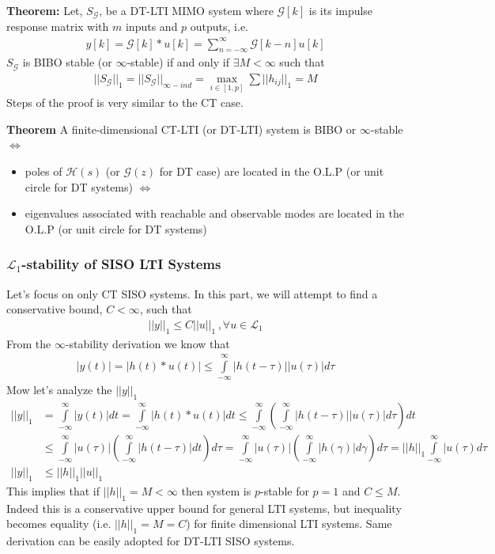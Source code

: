 \documentclass[twoside]{article}
\begin{document}
\textbf{Theorem:} Let, $S_{\mathcal{G}}$, be a DT-LTI MIMO system where $\mathcal{G}[k]$ is its impulse response matrix
with $m$ inputs and $p$ outputs, i.e.
%
\begin{align*}
y[k] = \mathcal{G}[k] * u[k] = \sum\limits_{n=-\infty}^{\infty} \mathcal{G}[k - n] u[k] 
\end{align*}
%
$S_{\mathcal{G}}$ is BIBO stable (or $\infty$-stable) if and only if $\exists M < \infty$ such that 
%
\begin{align*}
	|| S_{\mathcal{G}} ||_1 = || S_{\mathcal{G}} ||_{\infty-ind} = \underset{i \in [1,p]}{\max} \sum\limits || h_{ij} ||_1 = M
\end{align*}
%
Steps of the proof is very similar to the CT case.

\textbf{Theorem} A finite-dimensional CT-LTI (or DT-LTI) system is BIBO or $\infty$-stable $\iff$
\begin{itemize}
\item poles of $\mathcal{H}(s)$ (or $\mathcal{G}(z)$ for DT case) are located in the O.L.P (or unit circle for DT systems) $\iff$
\item eigenvalues associated with reachable and observable modes are located in the O.L.P (or unit circle for DT systems)
\end{itemize}

\subsubsection*{$\mathcal{L}_1$-stability of SISO LTI Systems}

Let's focus on only CT SISO systems. In this part, we will attempt to find a conservative bound, $C < \infty$, such that 
%
\begin{align*}
	|| y ||_1 \leq C || u ||_1 \, , \forall u \in \mathcal{L}_{1}
\end{align*}
% 
From the $\infty$-stability derivation we know that
%
%
\begin{align*}
	| y(t) | = | h(t) * u(t) | \leq \int\limits_{-\infty}^{\infty} | h(t - \tau ) | | u(\tau) | d\tau
\end{align*}
%  
Mow let's analyze the $|| y ||_1$
\begin{align*}
	|| y ||_1 &= \int\limits_{-\infty}^{\infty} | y(t) | dt = \int\limits_{-\infty}^{\infty} | h(t) * u(t) | dt 
	\leq \int\limits_{-\infty}^{\infty} \left( \int\limits_{-\infty}^{\infty} | h(t - \tau ) | | u(\tau) | d\tau \right) dt
	\\
	&\leq \int\limits_{-\infty}^{\infty} | u(\tau) | \left( \int\limits_{-\infty}^{\infty} | h(t - \tau ) | dt \right) d\tau 
	= \int\limits_{-\infty}^{\infty} | u(\tau) | \left( \int\limits_{-\infty}^{\infty} | h(\gamma) | d\gamma \right) d\tau 
	= || h ||_1 \int\limits_{-\infty}^{\infty} | u(\tau) d\tau 
	\\
	|| y ||_1 &\leq || h ||_1 || u ||_1
\end{align*}
%
This implies that if $ || h ||_1 = M < \infty $ then system is $p$-stable for $p = 1$ and $C \leq M$. Indeed this is a conservative upper bound 
for general LTI systems, but inequality becomes equality (i.e. $|| h ||_1 = M = C$) for finite dimensional LTI systems. Same derivation can
be easily adopted for DT-LTI SISO systems. 
\end{document}
